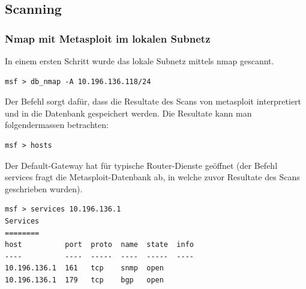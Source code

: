 \documentclass[11pt,a4paper]{scrartcl}
\begin{document}
\subsection{Scanning}
\subsubsection{Nmap mit Metasploit im lokalen Subnetz}
In einem ersten Schritt wurde das lokale Subnetz mittels nmap gescannt.
\begin{verbatim}msf > db_nmap -A 10.196.136.118/24\end{verbatim}
Der Befehl sorgt dafür, dass die Resultate des Scans von metasploit interpretiert und in die Datenbank gespeichert werden. Die Resultate kann man folgendermassen betrachten:
\begin{verbatim}msf > hosts\end{verbatim}

Der Default-Gateway hat für typische Router-Dienste geöffnet (der Befehl services fragt die Metasploit-Datenbank ab, in welche zuvor Resultate des Scans geschrieben wurden).
\begin{lstlisting}
msf > services 10.196.136.1
Services
========
host          port  proto  name  state  info
----          ----  -----  ----  -----  ----
10.196.136.1  161   tcp    snmp  open   
10.196.136.1  179   tcp    bgp   open
\end{lstlisting}
\end{document}
